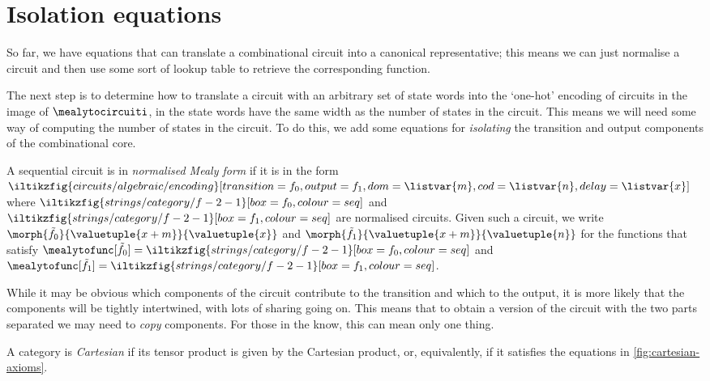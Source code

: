 \section{Isolation equations}

So far, we have equations that can translate a combinational circuit into a
canonical representative; this means we can just normalise a circuit and then
use some sort of lookup table to retrieve the corresponding function.

The next step is to determine how to translate a circuit with an arbitrary
set of state words into the `one-hot' encoding of circuits in the image of
\(\mealytocircuiti\), in the state words have the same width as the number of
states in the circuit.
This means we will need some way of computing the number of states in the
circuit.
To do this, we add some equations for \emph{isolating} the transition and output
components of the combinational core.

\begin{definition}
    A sequential circuit is in \emph{normalised Mealy form} if it is in the form
    \(
        \iltikzfig{circuits/algebraic/encoding}[transition={f_0},output={f_1},dom=\listvar{m},cod=\listvar{n},delay=\listvar{x}]
    \) where \(
        \iltikzfig{strings/category/f-2-1}[box=f_0,colour=seq]
    \) and \(
        \iltikzfig{strings/category/f-2-1}[box=f_1,colour=seq]
    \) are normalised circuits.
    Given such a circuit, we write \(
        \morph{\tilde{f}_{0}}{\valuetuple{x+m}}{{\valuetuple{x}}}
    \) and \(
        \morph{\tilde{f}_{1}}{\valuetuple{x+m}}{{\valuetuple{n}}}
    \) for the functions that satisfy \(
        \mealytofunc[\tilde{f}_{0}] = \iltikzfig{strings/category/f-2-1}[box=f_0,colour=seq]
    \) and \(
        \mealytofunc[\tilde{f}_{1}] = \iltikzfig{strings/category/f-2-1}[box=f_1,colour=seq]
    \).
\end{definition}

While it may be obvious which components of the circuit contribute to the
transition and which to the output, it is more likely that the components will
be tightly intertwined, with lots of sharing going on.
This means that to obtain a version of the circuit with the two parts separated
we may need to \emph{copy} components.
For those in the know, this can mean only one thing.

\begin{definition}
    A category is \emph{Cartesian} if its tensor product is given by the Cartesian
    product, or, equivalently, if it satisfies the equations in
    \cref{fig:cartesian-axioms}.
\end{definition}

